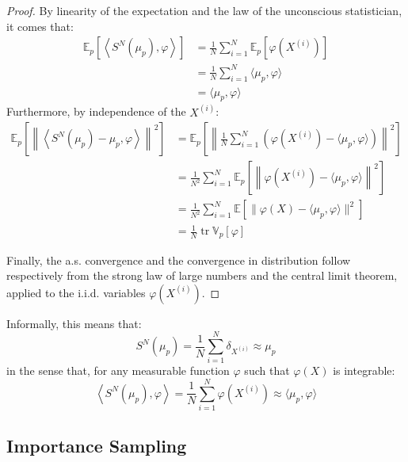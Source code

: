 \begin{proof}
	By linearity of the expectation and the law of the unconscious statistician, it comes that:
	\begin{equation}
		\begin{aligned}
		\mathbb{E}_p\left[\left\langle S^N(\mu_p),\varphi\right\rangle\right]&=\frac{1}{N}\sum_{i=1}^N\mathbb{E}_p\left[\varphi\left(X^{(i)}\right)\right]\\
		&=\frac{1}{N}\sum_{i=1}^N\langle\mu_p,\varphi\rangle\\
		&=\langle\mu_p,\varphi\rangle
		\end{aligned}
	\end{equation}
	Furthermore, by independence of the $X^{(i)}$:
	\begin{equation}
		\begin{aligned}
		\mathbb{E}_p\left[\left\|\left\langle S^N(\mu_p)-\mu_p,\varphi\right\rangle\right\|^2\right]&=\mathbb{E}_p\left[\left\|\frac{1}{N}\sum_{i=1}^N\left(\varphi\left(X^{(i)}\right)-\langle\mu_p,\varphi\rangle\right)\right\|^2\right]\\
		&=\frac{1}{N^2}\sum_{i=1}^N\mathbb{E}_p\left[\left\|\varphi\left(X^{(i)}\right)-\langle\mu_p,\varphi\rangle\right\|^2\right]\\
		&=\frac{1}{N^2}\sum_{i=1}^N\mathbb{E}\left[\|\varphi(X)-\langle\mu_p,\varphi\rangle\|^2\right]\\
		&=\frac{1}{N}\operatorname{tr}\mathbb{V}_p[\varphi]
		\end{aligned}
	\end{equation}

	Finally, the a.s. convergence and the convergence in distribution follow respectively from the strong law of large numbers and the central limit theorem, applied to the i.i.d. variables $\varphi\left(X^{(i)}\right)$.
\end{proof}

Informally, this means that:
\begin{equation}
	S^N(\mu_p)=\frac{1}{N}\sum_{i=1}^N\delta_{X^{(i)}}\approx\mu_p
\end{equation}
in the sense that, for any measurable function $\varphi$ such that $\varphi(X)$ is integrable:
\begin{equation}
	\left\langle S^N(\mu_p),\varphi\right\rangle=\frac{1}{N}\sum_{i=1}^N\varphi\left(X^{(i)}\right)\approx\langle\mu_p,\varphi\rangle
\end{equation}

\subsection{Importance Sampling}


